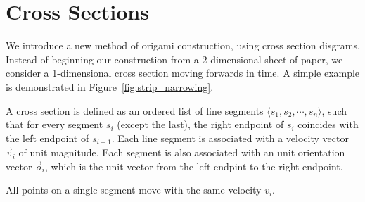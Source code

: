 \section{Cross Sections}
\label{sec:cross_sections}

We introduce a new method of origami construction, using cross section disgrams.
Instead of beginning our construction from a 2-dimensional sheet of paper,
we consider a 1-dimensional cross section moving forwards in time.
A simple example is demonstrated in Figure~\ref{fig:strip_narrowing}.


\begin{definition}
A cross section is defined as an ordered list of line segments $\langle s_1,s_2,\cdots,s_n\rangle$,
such that for every segment $s_i$ (except the last),
the right endpoint of $s_i$ coincides with the left endpoint of $s_{i+1}$.
Each line segment is associated with a velocity vector $\vec v_i$ of unit magnitude.
Each segment is also associated with an unit orientation vector $\vec o_i$,
which is the unit vector from the left endpint to the right endpoint.
\end{definition}

\begin{lemma}
\label{lem:uniform_velocity}
All points on a single segment move with the same velocity $v_i$.
\end{lemma}





